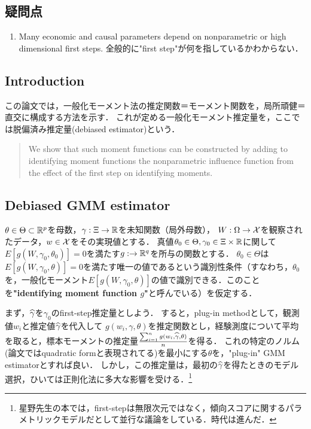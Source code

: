 \documentclass[uplatex,dvipdfmx]{jsreport}
\begin{document}
\subsection{疑問点}

\begin{enumerate}
    \item Many economic and causal parameters depend on nonparametric or high dimensional first steps.
    全般的に"first step"が何を指しているかわからない．

\end{enumerate}

\subsection{Introduction}

この論文では，一般化モーメント法の推定関数＝モーメント関数を，局所頑健＝直交に構成する方法を示す．
これが定める一般化モーメント推定量を，ここでは脱偏済み推定量(debiased estimator)という．
\begin{quote}
    We show that such moment functions can be constructed by adding
    to identifying moment functions the nonparametric influence function from the effect of the
    first step on identifying moments.
\end{quote}

\subsection{Debiased GMM estimator}

\begin{notation}
    $\theta\in\Theta\subset\mathbb{R}^p$を母数，$\gamma:\Xi\to\mathbb{R}$を未知関数（局外母数），
    $W:\Omega\to\mathcal{X}$を観察されたデータ，$w\in\mathcal{X}$をその実現値とする．
    真値$\theta_0\in\Theta,\gamma_0\in\Xi\times\mathbb{R}$に関して$E[g(W,\gamma_0,\theta_0)]=0$を満たす$g:\to\mathbb{R}^q$を所与の関数とする．
    $\theta_0\in\Theta$は$E[g(W,\gamma_0,\theta)]=0$を満たす唯一の値であるという識別性条件（すなわち，$\theta_0$を，一般化モーメント$E[g(W,\gamma_0,\theta)]$の値で識別できる．このことを\textbf{"identifying moment function $g$"}と呼んでいる）を仮定する．
\end{notation}

\begin{discussion}
    まず，$\widehat{\gamma}$を$\gamma_0$のfirst-step推定量としよう．
    すると，plug-in methodとして，観測値$w_i$と推定値$\widehat{\gamma}$を代入して
    $g(w_i,\gamma,\theta)$を推定関数とし，経験測度について平均を取ると，標本モーメントの推定量$\frac{\sum_{i=1}^ng(w_i,\widehat{\gamma},\theta)}{n}$を得る．
    これの特定のノルム(論文ではquadratic formと表現されてる)を最小にする$\theta$を，"plug-in" GMM estimatorとすれば良い．
    しかし，この推定量は，最初の$\widehat{\gamma}$を得たときのモデル選択，ひいては正則化法に多大な影響を受ける．\footnote{星野先生の本では，first-stepは無限次元ではなく，傾向スコアに関するパラメトリックモデルだとして並行な議論をしている．時代は進んだ．}
\end{discussion}
\end{document}

